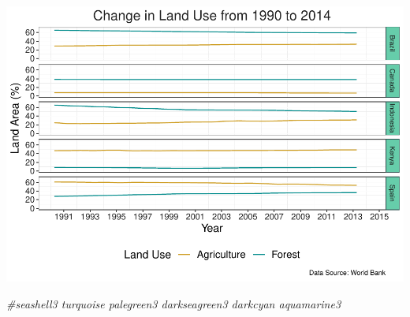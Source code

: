 \documentclass[12pt,]{article}
\newenvironment{Shaded}{\begin{snugshade}}{\end{snugshade}}
\newcommand{\CommentTok}[1]{\textcolor[rgb]{0.56,0.35,0.01}{\textit{#1}}}
\begin{document}
\includegraphics{Marx_ENV872_Project_files/figure-latex/unnamed-chunk-6-1.pdf}

\begin{Shaded}
\begin{Highlighting}[]
\CommentTok{#seashell3 turquoise palegreen3 darkseagreen3 darkcyan aquamarine3}
\end{Highlighting}
\end{Shaded}
\end{document}
